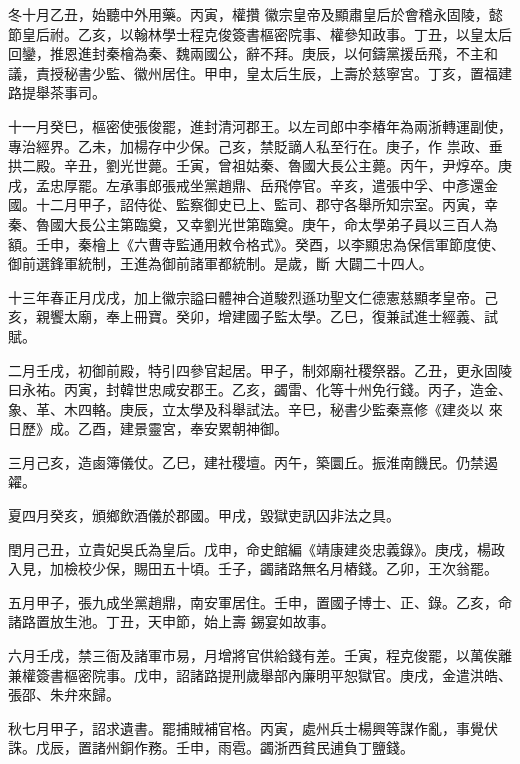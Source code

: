 \begin{pinyinscope}
 冬十月乙丑，始聽中外用藥。丙寅，權攢
 徽宗皇帝及顯肅皇后於會稽永固陵，懿節皇后祔。乙亥，以翰林學士程克俊簽書樞密院事、權參知政事。丁丑，以皇太后回鑾，推恩進封秦檜為秦、魏兩國公，辭不拜。庚辰，以何鑄黨援岳飛，不主和議，責授秘書少監、徽州居住。甲申，皇太后生辰，上壽於慈寧宮。丁亥，置福建路提舉茶事司。



 十一月癸巳，樞密使張俊罷，進封清河郡王。以左司郎中李椿年為兩浙轉運副使，專治經界。乙未，加楊存中少保。己亥，禁貶謫人私至行在。庚子，作
 祟政、垂拱二殿。辛丑，劉光世薨。壬寅，曾祖姑秦、魯國大長公主薨。丙午，尹焞卒。庚戌，孟忠厚罷。左承事郎張戒坐黨趙鼎、岳飛停官。辛亥，遣張中孚、中彥還金國。十二月甲子，詔侍從、監察御史已上、監司、郡守各舉所知宗室。丙寅，幸秦、魯國大長公主第臨奠，又幸劉光世第臨奠。庚午，命太學弟子員以三百人為額。壬申，秦檜上《六曹寺監通用敕令格式》。癸酉，以李顯忠為保信軍節度使、御前選鋒軍統制，王進為御前諸軍都統制。是歲，斷
 大闢二十四人。



 十三年春正月戊戌，加上徽宗謚曰體神合道駿烈遜功聖文仁德憲慈顯孝皇帝。己亥，親饗太廟，奉上冊寶。癸卯，增建國子監太學。乙巳，復兼試進士經義、試賦。



 二月壬戌，初御前殿，特引四參官起居。甲子，制郊廟社稷祭器。乙丑，更永固陵曰永祐。丙寅，封韓世忠咸安郡王。乙亥，蠲雷、化等十州免行錢。丙子，造金、象、革、木四輅。庚辰，立太學及科舉試法。辛巳，秘書少監秦熹修《建炎以
 來日歷》成。乙酉，建景靈宮，奉安累朝神御。



 三月己亥，造鹵簿儀仗。乙巳，建社稷壇。丙午，築圜丘。振淮南饑民。仍禁遏糴。



 夏四月癸亥，頒鄉飲酒儀於郡國。甲戌，毀獄吏訊囚非法之具。



 閏月己丑，立貴妃吳氏為皇后。戊申，命史館編《靖康建炎忠義錄》。庚戌，楊政入見，加檢校少保，賜田五十頃。壬子，蠲諸路無名月樁錢。乙卯，王次翁罷。



 五月甲子，張九成坐黨趙鼎，南安軍居住。壬申，置國子博士、正、錄。乙亥，命諸路置放生池。丁丑，天申節，始上壽
 錫宴如故事。



 六月壬戌，禁三衙及諸軍市易，月增將官供給錢有差。壬寅，程克俊罷，以萬俟離兼權簽書樞密院事。戊申，詔諸路提刑歲舉部內廉明平恕獄官。庚戌，金遣洪皓、張邵、朱弁來歸。



 秋七月甲子，詔求遺書。罷捕賊補官格。丙寅，處州兵士楊興等謀作亂，事覺伏誅。戊辰，置諸州銅作務。壬申，雨雹。蠲浙西貧民逋負丁鹽錢。




\end{pinyinscope}
